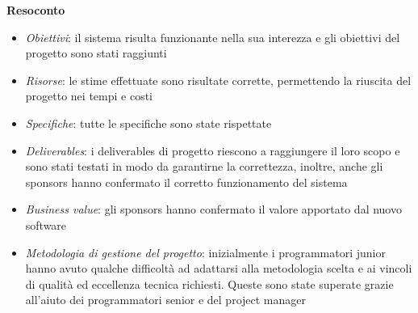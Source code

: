 \textbf{Resoconto}
\begin{itemize}
    \item \textit{Obiettivi}: il sistema risulta funzionante nella sua interezza e gli obiettivi del progetto sono 
    stati raggiunti
    \item \textit{Risorse}: le stime effettuate sono risultate corrette, permettendo la riuscita del progetto nei
    tempi e costi
    \item \textit{Specifiche}: tutte le specifiche sono state rispettate
    \item \textit{Deliverables}: i deliverables di progetto riescono a raggiungere il loro scopo e sono stati testati 
    in modo da garantirne la correttezza, inoltre, anche gli sponsors hanno confermato il corretto funzionamento 
    del sistema
    \item \textit{Business value}: gli sponsors hanno confermato il valore apportato dal nuovo software
    \item \textit{Metodologia di gestione del progetto}: inizialmente i programmatori junior hanno avuto qualche 
    difficoltà ad adattarsi alla metodologia scelta e ai vincoli di qualità ed eccellenza tecnica richiesti. 
    Queste sono state superate grazie all'aiuto dei programmatori senior e del project manager
\end{itemize}